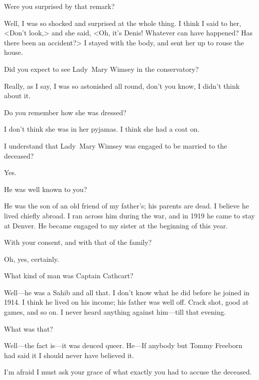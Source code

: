 \begin{dialogue}

 Were you surprised by that remark?

 Well, I was so shocked and surprised at the whole thing.  I think I said to her, <Don't look,> and she said, <Oh, it's Denis!  Whatever can have happened? Has there been an accident?> I stayed with the body, and sent her up to rouse the house.

 Did you expect to see Lady~Mary Wimsey in the conservatory?

 Really, as I say, I was so astonished all round, don't you know, I didn't think about it.

 Do you remember how she was dressed?

 I don't think she was in her pyjamas.  I think she had a coat on.

 I understand that Lady~Mary Wimsey was engaged to be married to the deceased?

 Yes.

 He was well known to you?

 He was the son of an old friend of my father's; his parents are dead. I believe he lived chiefly abroad. I ran across him during the war, and in 1919 he came to stay at Denver. He became engaged to my sister at the beginning of this year.

 With your consent, and with that of the family?

 Oh, yes, certainly.

 What kind of man was Captain Cathcart?

 Well—he was a Sahib and all that. I don't know what he did before he joined in 1914. I think he lived on his income; his father was well off. Crack shot, good at games, and so on. I never heard anything against him—till that evening.

 What was that?

 Well—the fact is—it was deuced queer. He—If anybody but Tommy Freeborn had said it I should never have believed it. 

 I'm afraid I must ask your grace of what exactly you had to accuse the deceased.


\end{dialogue}
